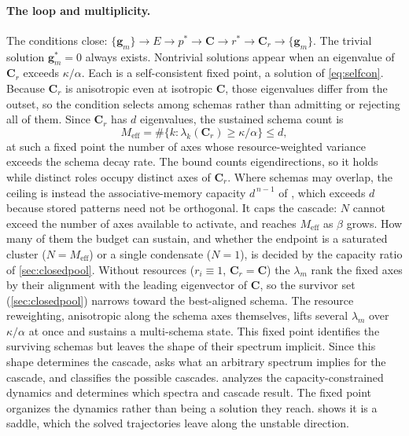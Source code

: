 \documentclass[
  aps,prx,
  reprint,
  superscriptaddress,
  nofootinbib,
  longbibliography
]{revtex4-2}
\newcommand{\g}{\mathbf{g}}
\newcommand{\C}{\mathbf{C}}
\newcommand{\Cr}{\mathbf{C}_r}
\newcommand{\smref}[1]{\cite[Sec.~#1]{SM}}
\begin{document}
\paragraph{The loop and multiplicity.} The conditions close: $\{\g_m\}\!\to\! E\!\to\! p^*\!\to\!\C\!\to\! r^*\!\to\!\Cr\!\to\!\{\g_m\}$. The trivial solution $\g_m^*=0$ always exists. Nontrivial solutions appear when an eigenvalue of $\Cr$ exceeds $\kappa/\alpha$. Each is a self-consistent fixed point, a solution of \cref{eq:selfcon}. Because $\Cr$ is anisotropic even at isotropic $\C$, those eigenvalues differ from the outset, so the condition selects among schemas rather than admitting or rejecting all of them. Since $\Cr$ has $d$ eigenvalues, the sustained schema count is
\begin{equation}\label{eq:Meff}
M_{\mathrm{eff}}=\#\{k:\lambda_k(\Cr)\ge\kappa/\alpha\}\le d,
\end{equation}
at such a fixed point the number of axes whose resource-weighted variance exceeds the schema decay rate. The bound counts eigendirections, so it holds while distinct roles occupy distinct axes of $\Cr$. Where schemas may overlap, the ceiling is instead the associative-memory capacity $d^{\,n-1}$ of \smref{S3}, which exceeds $d$ because stored patterns need not be orthogonal. It caps the cascade: $N$ cannot exceed the number of axes available to activate, and reaches $M_{\mathrm{eff}}$ as $\beta$ grows. How many of them the budget can sustain, and whether the endpoint is a saturated cluster ($N=M_{\mathrm{eff}}$) or a single condensate ($N=1$), is decided by the capacity ratio of \cref{sec:closedpool}. Without resources ($r_i\equiv1$, $\Cr=\C$) the $\lambda_m$ rank the fixed axes by their alignment with the leading eigenvector of $\C$, so the survivor set (\cref{sec:closedpool}) narrows toward the best-aligned schema. The resource reweighting, anisotropic along the schema axes themselves, lifts several $\lambda_m$ over $\kappa/\alpha$ at once and sustains a multi-schema state. This fixed point identifies the surviving schemas but leaves the shape of their spectrum implicit. Since this shape determines the cascade,  asks what an arbitrary spectrum implies for the cascade, and classifies the possible cascades.  analyzes the capacity-constrained dynamics and determines which spectra and cascade result. The fixed point organizes the dynamics rather than being a solution they reach.  shows it is a saddle, which the solved trajectories leave along the unstable direction.
\end{document}
